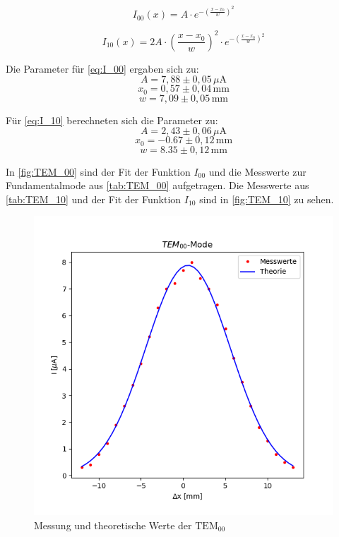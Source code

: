 \begin{equation}
I_{00}(x) = A \cdot e^{-(\frac{x-x_0}{w})^{2}}
\label{eq:I_00}
\end{equation}

\begin{equation}
I_{10}(x) = 2A \cdot (\frac{x-x_0}{w})^{2} \cdot e^{-(\frac{x-x_0}{w})^{2}}
\label{eq:I_10}
\end{equation}

Die Parameter für \autoref{eq:I_00} ergaben sich zu:
\begin{equation}
A = 7,88 \pm 0,05 \,\mu \text{A}
\end{equation}
\begin{equation}
x_0 =  0,57 \pm 0,04\, \text{mm}
\end{equation}
\begin{equation}
w = 7,09 \pm 0,05\, \text{mm}
\end{equation}



Für \autoref{eq:I_10} berechneten sich die Parameter zu:
\begin{equation}
A = 2,43 \pm 0,06 \,\mu \text{A}
\end{equation}
\begin{equation}
x_0 =  -0.67 \pm 0,12\, \text{mm}
\end{equation}
\begin{equation}
w = 8.35 \pm 0,12\, \text{mm}
\end{equation}




In \autoref{fig:TEM_00} sind der Fit der Funktion $I_{00}$ und die Messwerte zur Fundamentalmode aus \autoref{tab:TEM_00} aufgetragen. Die Messwerte aus \autoref{tab:TEM_10} und der Fit der Funktion $I_{10}$ sind in \autoref{fig:TEM_10} zu sehen.


\begin{figure}
\includegraphics{figures/TEM_00.png}
\caption{Messung und theoretische Werte der $\text{TEM}_{00}$}
\label{fig:TEM_00}
\end{figure}



